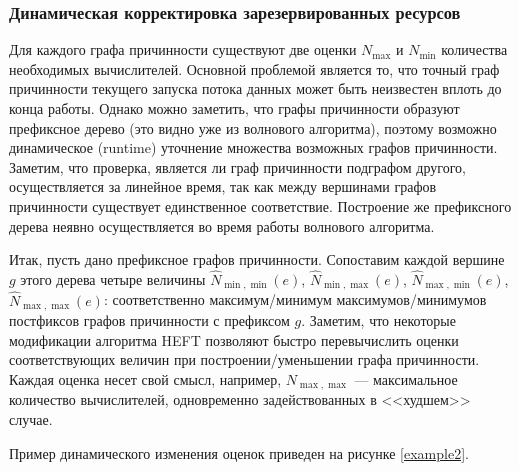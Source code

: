 \documentclass[10pt,a4paper]{article}
\begin{document}
 \subsubsection{Динамическая корректировка зарезервированных ресурсов}
   Для каждого графа причинности существуют две оценки $N_{\max}$ и $N_{\min}$ количества необходимых вычислителей.
   Основной проблемой является то, что точный граф причинности текущего запуска потока данных может быть неизвестен вплоть до конца работы.
   Однако можно заметить, что графы причинности образуют префиксное дерево (это видно уже из волнового алгоритма), поэтому возможно
   динамическое (runtime) уточнение множества возможных графов причинности. Заметим, что проверка, является ли граф причинности подграфом другого, осуществляется
   за линейное время, так как между вершинами графов причинности существует единственное соответствие. Построение же префиксного дерева неявно осуществляется во время работы
   волнового алгоритма.
   
   Итак, пусть дано префиксное графов причинности. Сопоставим каждой вершине $g$ этого дерева четыре величины $\hat{N}_{\min, \min}(e)$, $\hat{N}_{\min, \max}(e)$,
   $\hat{N}_{\max, \min}(e)$, $\hat{N}_{\max, \max}(e)$: соответственно максимум/минимум максимумов/минимумов постфиксов графов причинности с префиксом $g$.
   Заметим, что некоторые модификации алгоритма HEFT позволяют быстро перевычислить оценки соответствующих величин при построении/уменьшении графа причинности.
   Каждая оценка несет свой смысл, например, $N_{\max, \max}$ --- максимальное количество вычислителей, одновременно задействованных в <<худшем>> случае.
   
   Пример динамического изменения оценок приведен на рисунке \ref{example2}.
   
\end{document}
